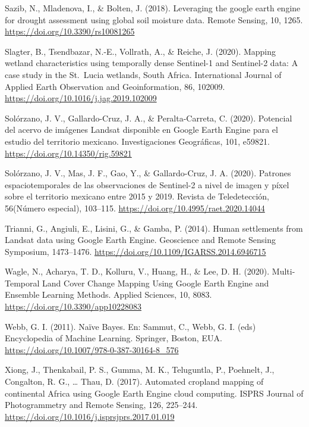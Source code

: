 \documentclass[
  12pt,
  letterpaper,
  twoside]{book}
\begin{document}
Sazib, N., Mladenova, I., \& Bolten, J. (2018). Leveraging the google earth engine for drought assessment using global soil moisture data. Remote Sensing, 10, 1265. \url{https://doi.org/10.3390/rs10081265}

Slagter, B., Tsendbazar, N.-E., Vollrath, A., \& Reiche, J. (2020). Mapping wetland characteristics using temporally dense Sentinel-1 and Sentinel-2 data: A case study in the St.~Lucia wetlands, South Africa. International Journal of Applied Earth Observation and Geoinformation, 86, 102009. \url{https://doi.org/10.1016/j.jag.2019.102009}

Solórzano, J. V., Gallardo-Cruz, J. A., \& Peralta-Carreta, C. (2020). Potencial del acervo de imágenes Landsat disponible en Google Earth Engine para el estudio del territorio mexicano. Investigaciones Geográficas, 101, e59821. \url{https://doi.org/10.14350/rig.59821}

Solórzano, J. V., Mas, J. F., Gao, Y., \& Gallardo-Cruz, J. A. (2020). Patrones espaciotemporales de las observaciones de Sentinel-2 a nivel de imagen y píxel sobre el territorio mexicano entre 2015 y 2019. Revista de Teledetección, 56(Número especial), 103--115. \url{https://doi.org/10.4995/raet.2020.14044}

Trianni, G., Angiuli, E., Lisini, G., \& Gamba, P. (2014). Human settlements from Landsat data using Google Earth Engine. Geoscience and Remote Sensing Symposium, 1473--1476. \url{https://doi.org/10.1109/IGARSS.2014.6946715}

Wagle, N., Acharya, T. D., Kolluru, V., Huang, H., \& Lee, D. H. (2020). Multi-Temporal Land Cover Change Mapping Using Google Earth Engine and Ensemble Learning Methods. Applied Sciences, 10, 8083. \url{https://doi.org/10.3390/app10228083}

Webb, G. I. (2011). Naïve Bayes. En: Sammut, C., Webb, G. I. (eds) Encyclopedia of Machine Learning. Springer, Boston, EUA. \url{https://doi.org/10.1007/978-0-387-30164-8_576}

Xiong, J., Thenkabail, P. S., Gumma, M. K., Teluguntla, P., Poehnelt, J., Congalton, R. G., \ldots{} Thau, D. (2017). Automated cropland mapping of continental Africa using Google Earth Engine cloud computing. ISPRS Journal of Photogrammetry and Remote Sensing, 126, 225--244. \url{https://doi.org/10.1016/j.isprsjprs.2017.01.019}
\end{document}
